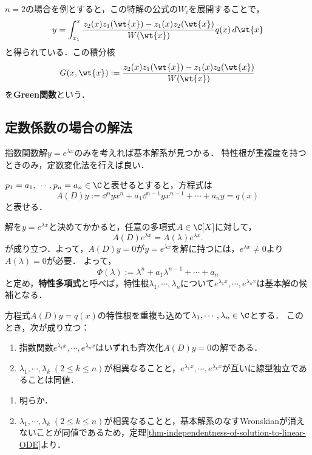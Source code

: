 \documentclass[uplatex,dvipdfmx]{jsreport}
\begin{document}
\begin{remark}
    $n=2$の場合を例とすると，この特解の公式の$W_i$を展開することで，
    \[y=\int^x_{x_1}\frac{z_2(x)z_1(\wt{x})-z_1(x)z_2(\wt{x})}{W(\wt{x})}q(x)\,d\wt{x}\]
    と得られている．この積分核
    \[G(x,\wt{x}):=\frac{z_2(x)z_1(\wt{x})-z_1(x)z_2(\wt{x})}{W(\wt{x})}\]
    を\textbf{Green関数}という．
\end{remark}

\subsection{定数係数の場合の解法}

\begin{tcolorbox}[colframe=ForestGreen, colback=ForestGreen!10!white,breakable,colbacktitle=ForestGreen!40!white,coltitle=black,fonttitle=\bfseries\sffamily,
title=]
    指数関数解$y=e^{\lambda x}$のみを考えれば基本解系が見つかる．
    特性根が重複度を持つときのみ，定数変化法を行えば良い．
\end{tcolorbox}

\begin{problem}
    $p_1=a_1,\cdots,p_n=a_n\in\C$と表せるとすると，方程式は
    \[A(D)y:=\dd{^ny}{x^n}+a_1\dd{^{n-1}y}{x^{n-1}}+\cdots+a_ny=q(x)\]
    と表せる．
\end{problem}
\begin{observation}
    解を$y=e^{\lambda x}$と決めてかかると，任意の多項式$A\in\C[X]$に対して，
    \[A(D)e^{\lambda x}=A(\lambda)e^{\lambda x}.\]
    が成り立つ．よって，$A(D)y=0$が$y=e^{\lambda x}$を解に持つには，$e^{\lambda x}\ne0$より$A(\lambda)=0$が必要．
    よって，
    \[\Phi(\lambda):=\lambda^n+a_1\lambda^{n-1}+\cdots+a_n\]
    と定め，\textbf{特性多項式}と呼べば，特性根$\lambda_1,\cdots,\lambda_n$について$e^{\lambda_1x},\cdots,e^{\lambda_nx}$は基本解の候補となる．
\end{observation}

\begin{proposition}[定数係数線型ODEの指数関数解]\label{prop-fundamental-solution-to-linear-ODE}
    方程式$A(D)y=q(x)$の特性根を重複も込めて$\lambda_1,\cdots,\lambda_n\in\C$とする．
    このとき，次が成り立つ：
    \begin{enumerate}
        \item 指数関数$e^{\lambda_1x},\cdots,e^{\lambda_nx}$はいずれも斉次化$A(D)y=0$の解である．
        \item $\lambda_1,\cdots,\lambda_k\;(2\le k\le n)$が相異なることと，$e^{\lambda_1x},\cdots,e^{\lambda_kx}$が互いに線型独立であることは同値．
    \end{enumerate}
\end{proposition}
\begin{Proof}\mbox{}
    \begin{enumerate}
        \item 明らか．
        \item $\lambda_1,\cdots,\lambda_k\;(2\le k\le n)$が相異なることと，基本解系のなすWronskianが消えないことが同値であるため，定理\ref{thm-independentness-of-solution-to-linear-ODE}より．
    \end{enumerate}
\end{Proof}
\end{document}
